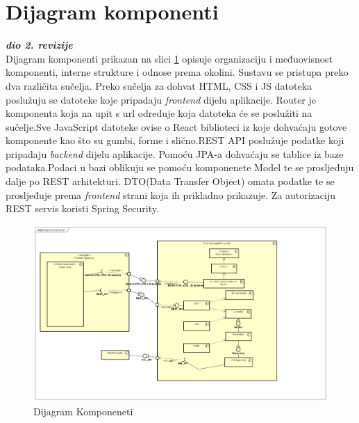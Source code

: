 		\section{Dijagram komponenti}
		
			\textbf{\textit{dio 2. revizije}}\\
			
			\text   Dijagram komponenti prikazan na slici \ref{fig:4.12} opisuje organizaciju i međuovisnost
            komponenti, interne strukture i odnose prema okolini. Sustavu se pristupa preko dva različita sučelja. Preko sučelja za dohvat HTML, CSS i JS datoteka poslužuju se
            datoteke koje pripadaju \emph{frontend} dijelu aplikacije. Router je komponenta koja na
            upit s url odreduje koja datoteka će se poslužiti na sučelje.Sve JavaScript datoteke ovise o React biblioteci iz koje dohvaćaju gotove komponente kao što su gumbi, forme i slično.REST API poslužuje
            podatke koji pripadaju \emph{backend} dijelu aplikacije. Pomoću JPA-a dohvaćaju se tablice iz baze podataka.Podaci  u bazi oblikuju se pomoću komponenete Model te se prosljeđuju dalje po REST arhitekturi. DTO(Data Transfer Object) omata podatke te se prosljeđuje prema \emph{frontend} strani koja ih prikladno prikazuje. Za autorizaciju REST servis koristi Spring Security.
			
		\begin{figure}[H]
			\includegraphics[scale=0.3]{slike/Dijagram Komponeneti.png} %
			\centering
			\caption { Dijagram Komponeneti}
			\label{fig:4.12}
			\end{figure}
			


